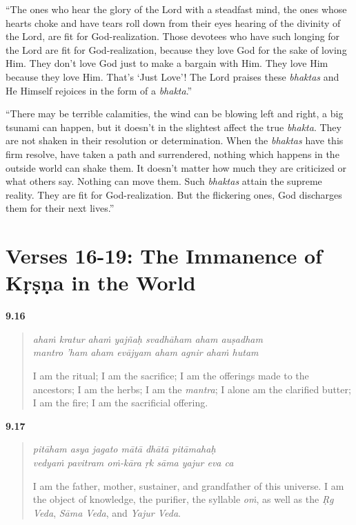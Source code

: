 \enquote{The ones who hear the glory of the Lord with a steadfast mind, the ones whose hearts choke and have tears roll down from their eyes hearing of the divinity of the Lord, are fit for God-realization. Those devotees who have such longing for the Lord are fit for God-realization, because they love God for the sake of loving Him. They don’t love God just to make a bargain with Him. They love Him because they love Him. That’s \enquote{Just Love}! The Lord praises these \textit{bhaktas} and He Himself rejoices in the form of a \textit{bhakta}.}

\enquote{There may be terrible calamities, the wind can be blowing left and right, a big tsunami can happen, but it doesn’t in the slightest affect the true \textit{bhakta}. They are not shaken in their resolution or determination. When the \textit{bhaktas} have this firm resolve, have taken a path and surrendered, nothing which happens in the outside world can shake them. It doesn’t matter how much they are criticized or what others say. Nothing can move them. Such \textit{bhaktas} attain the supreme reality. They are fit for God-realization. But the flickering ones, God discharges them for their next lives.}

\section{Verses 16-19: The Immanence of Kṛṣṇa in the World}\label{sec-verses-16-19-the-immanence-of-krsna-in-the-world}


\par\noindent\textbf{9.16}\par
\begin{verse}
\textit{ahaṁ kratur ahaṁ yajñaḥ svadhāham aham auṣadham} \\
\textit{mantro ’ham aham evājyam aham agnir ahaṁ hutam}

\noindent I am the ritual; I am the sacrifice; I am the offerings made to the ancestors; I am the herbs; I am the \textit{mantra}; I alone am the clarified butter; I am the fire; I am the sacrificial offering.
\end{verse}
\par



\par\noindent\textbf{9.17}\par
\begin{verse}
\textit{pitāham asya jagato mātā dhātā pitāmahaḥ} \\
\textit{vedyaṁ pavitram oṁ-kāra ṛk sāma yajur eva ca}

\noindent I am the father, mother, sustainer, and grandfather of this universe. I am the object of knowledge, the purifier, the syllable \textit{oṁ}, as well as the \textit{Ṛg Veda}, \textit{Sāma Veda}, and \textit{Yajur Veda}.
\end{verse}
\par



